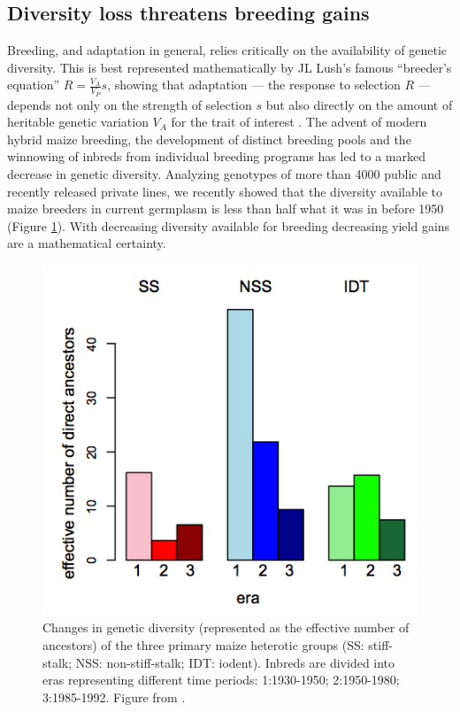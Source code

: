 \documentclass[draft,12pt]{article}
\begin{document}
\subsection*{Diversity loss threatens breeding gains}

Breeding, and adaptation in general, relies critically on the availability of genetic diversity. 
This is best represented mathematically by JL Lush's famous ``breeder's equation'' $R=\frac{V_A}{V_P}s$, showing that adaptation --- the response to selection $R$ --- depends not only on the strength of selection $s$ but also directly on the amount of heritable genetic variation $V_A$ for the trait of interest \citep{kelly2011breeder}. 
The advent of modern hybrid maize breeding, the development of distinct breeding pools and the winnowing of inbreds from individual breeding programs has led to a marked decrease in genetic diversity. 
Analyzing genotypes of more than 4000 public and recently released private lines, we recently showed that the diversity available to maize breeders in current germplasm is less than half what it was in before 1950 (Figure \ref{fig:diversity}). 
With decreasing diversity available for breeding decreasing yield gains are a mathematical certainty. 

\begin{figure}
\includegraphics[width=0.5\linewidth]{joost_diversity.png}
\caption{Changes in genetic diversity (represented as the effective number of ancestors) of the three primary maize heterotic groups (SS: stiff-stalk; NSS: non-stiff-stalk; IDT: iodent). Inbreds are divided into eras representing different time periods: 1:1930-1950; 2:1950-1980; 3:1985-1992. Figure from \citet{van2012historical}.} 
\label{fig:diversity}
\end{figure}
\end{document}
